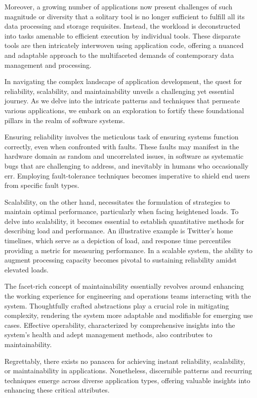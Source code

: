 Moreover, a growing number of applications now present challenges of such
magnitude or diversity that a solitary tool is no longer sufficient to fulfill
all its data processing and storage requisites. Instead, the workload is
deconstructed into tasks amenable to efficient execution by individual tools.
These disparate tools are then intricately interwoven using application code,
offering a nuanced and adaptable approach to the multifaceted demands of
contemporary data management and processing.

In navigating the complex landscape of application development, the quest for
reliability, scalability, and maintainability unveils a challenging yet
essential journey. As we delve into the intricate patterns and techniques that
permeate various applications, we embark on an exploration to fortify these
foundational pillars in the realm of software systems.

Ensuring reliability involves the meticulous task of ensuring systems function
correctly, even when confronted with faults. These faults may manifest in the
hardware domain as random and uncorrelated issues, in software as systematic
bugs that are challenging to address, and inevitably in humans who occasionally
err. Employing fault-tolerance techniques becomes imperative to shield end users
from specific fault types.

Scalability, on the other hand, necessitates the formulation of strategies to
maintain optimal performance, particularly when facing heightened loads. To
delve into scalability, it becomes essential to establish quantitative methods
for describing load and performance. An illustrative example is Twitter's home
timelines, which serve as a depiction of load, and response time percentiles
providing a metric for measuring performance. In a scalable system, the ability
to augment processing capacity becomes pivotal to sustaining reliability amidst
elevated loads.

The facet-rich concept of maintainability essentially revolves around enhancing
the working experience for engineering and operations teams interacting with the
system. Thoughtfully crafted abstractions play a crucial role in mitigating
complexity, rendering the system more adaptable and modifiable for emerging use
cases. Effective operability, characterized by comprehensive insights into the
system's health and adept management methods, also contributes to
maintainability.

Regrettably, there exists no panacea for achieving instant reliability,
scalability, or maintainability in applications. Nonetheless, discernible
patterns and recurring techniques emerge across diverse application types,
offering valuable insights into enhancing these critical attributes.

